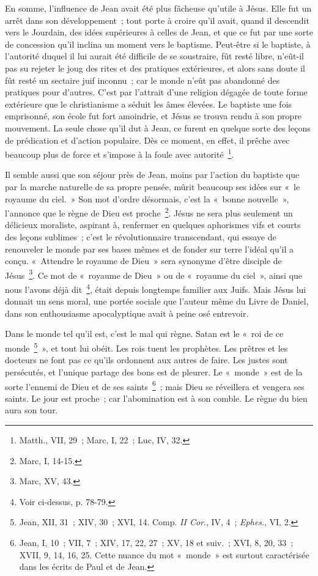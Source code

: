 \documentclass[french,twoside]{book} %
\begin{document}
En somme, l’influence de Jean avait été plus fâcheuse qu’utile à Jésus. Elle fut un arrêt dans son développement ; tout porte à croire qu’il avait, quand il descendit vers le Jourdain, des idées supérieures à celles de Jean, et que ce fut par une sorte de concession qu’il inclina un moment vers le baptisme. Peut-être si le baptiste, à l’autorité duquel il lui aurait été difficile de se soustraire, fût resté libre, n’eût-il pas su rejeter le joug des rites et des pratiques extérieures, et alors sans doute il fût resté un sectaire juif inconnu ; car le monde n’eût pas abandonné des pratiques pour d’autres. C’est par l’attrait d’une religion dégagée de toute forme extérieure que le christianisme a séduit les âmes élevées. Le baptiste une fois emprisonné, son école fut fort amoindrie, et Jésus se trouva rendu à son propre mouvement. La seule chose qu’il dut à Jean, ce furent en quelque sorte des leçons de prédication et d’action populaire. Dès ce moment, en effet, il prêche avec beaucoup plus de force et s’impose à la foule avec autorité \footnote{Matth., VII, 29 ; Marc, I, 22 ; Luc, IV, 32.}.\par
Il semble aussi que son séjour près de Jean, moins par l’action du baptiste que par la marche naturelle de sa propre pensée, mûrit beaucoup ses idées sur « le royaume du ciel. » Son mot d’ordre désormais, c’est la « bonne nouvelle », l’annonce que le règne de Dieu est proche \footnote{Marc, I, 14-15.}. Jésus ne sera plus seulement un délicieux moraliste, aspirant à, renfermer en quelques aphorismes vifs et courts des leçons sublimes ; c’est le révolutionnaire transcendant, qui essaye de renouveler le monde par ses bases mêmes et de fonder sur terre l’idéal qu’il a conçu. « Attendre le royaume de Dieu » sera synonyme d’être disciple de Jésus \footnote{Marc, XV, 43.}. Ce mot de « royaume de Dieu » ou de « royaume du ciel », ainsi que nous l’avons déjà dit \footnote{Voir ci-dessus, p. 78-79.}, était depuis longtemps familier aux Juifs. Mais Jésus lui donnait un sens moral, une portée sociale que l’auteur même du Livre de Daniel, dans son enthousiasme apocalyptique avait à peine osé entrevoir.\par
Dans le monde tel qu’il est, c’est le mal qui règne. Satan est le « roi de ce monde \footnote{ Jean, XII, 31 ; XIV, 30 ; XVI, 14. Comp. {\itshape II Cor}., IV, 4 ; {\itshape Ephes}., VI, 2.} », et tout lui obéit. Les rois tuent les prophètes. Les prêtres et les docteurs ne font pas ce qu’ils ordonnent aux autres de faire. Les justes sont persécutés, et l’unique partage des bons est de pleurer. Le « monde » est de la sorte l’ennemi de Dieu et de ses saints \footnote{Jean, I, 10 ; VII, 7 ; XIV, 17, 22, 27 ; XV, 18 et suiv. ; XVI, 8, 20, 33 ; XVII, 9, 14, 16, 25. Cette nuance du mot « monde » est surtout caractérisée dans les écrits de Paul et de Jean.} ; mais Dieu se réveillera et vengera ses saints. Le jour est proche ; car l’abomination est à son comble. Le règne du bien aura son tour.\par
\end{document}

